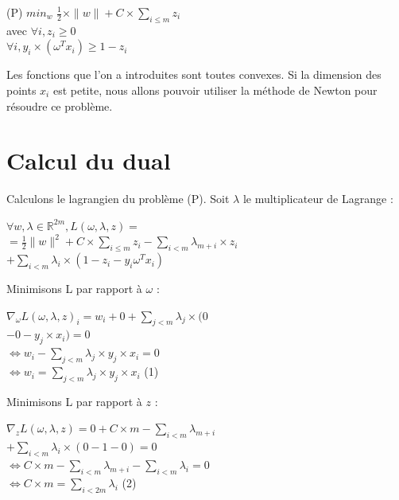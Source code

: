 \documentclass{article}
\begin{document}
           \begin{centre}
           (P) $min_{w}$ $\frac{1}{2} \times \|w\| + C \times \sum_{i \leq m}z_i$\\
           avec $\forall i, z_i \geq 0$\\
           $\forall i, y_i \times (\omega^{T} x_i) \geq 1 - z_i$\\
           \end{centre}

\bigskip

Les fonctions que l'on a introduites sont toutes convexes. Si la dimension des points $x_i$ est petite, nous allons pouvoir utiliser la méthode de Newton pour résoudre ce problème.

\section{Calcul du dual}

Calculons le lagrangien du problème (P). Soit $\lambda$ le multiplicateur de Lagrange :

              \begin{center}
              $\forall w, \lambda \in \mathbb{R}^{2m}, L(\omega, \lambda, z) = $\\
              $= \frac{1}{2} \|w\|^2 + C \times \sum_{i \leq m} z_i - \sum_{i < m} \lambda_{m+i} \times z_i$\\
              $+ \sum_{i < m} \lambda_i \times (1 - z_i - y_i \omega^{T} x_i)$\\
              \end{center}

Minimisons L par rapport à $\omega$ :\\

              \begin{center}
              $\nabla_{\omega} L(\omega, \lambda, z)_i = w_i + 0 + \sum_{j < m} \lambda_j \times (0$\\
              $- 0 - y_j \times x_i) = 0$\\
              $\Leftrightarrow w_i - \sum_{j < m} \lambda_j \times y_j \times x_i = 0$\\
              $\Leftrightarrow w_i = \sum_{j < m} \lambda_j \times y_j \times x_i$ (1)\\
              \end{center}

Minimisons L par rapport à $z$ :\\

              \begin{center}
              $\nabla_{z} L(\omega, \lambda, z) = 0 + C \times m - \sum_{i < m} \lambda_{m+i} $\\
              $+ \sum_{i < m} \lambda_i \times (0 - 1 - 0) = 0$\\
              $\Leftrightarrow C \times m - \sum_{i < m} \lambda_{m+i} - \sum_{i < m} \lambda_i = 0$\\
              $\Leftrightarrow  C \times m = \sum_{i < 2m} \lambda_i$ (2)\\
              \end{center}
\end{document}
